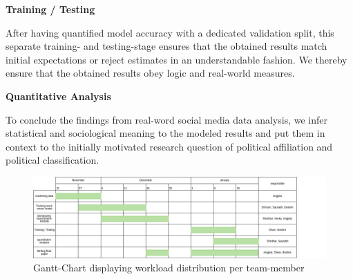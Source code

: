 \documentclass[10pt, oneside]{article}
\begin{document}
\begin{flushleft}
\textbf{Training / Testing}

After having quantified model accuracy with a dedicated validation split, this separate training- and testing-stage ensures that the obtained results match initial expectations or reject estimates in an understandable fashion. We thereby ensure that the obtained results obey logic and real-world measures.
\end{flushleft}

\begin{flushleft}
\textbf{Quantitative Analysis}

To conclude the findings from real-word social media data analysis, we infer statistical and sociological meaning to the modeled results and put them in context to the initially motivated research question of political affiliation and political classification.
\end{flushleft}

\begin{figure}
  \includegraphics[width=\textwidth]{gantt.png}
  \caption{Gantt-Chart displaying workload distribution per team-member}
\end{figure}




\end{document}
